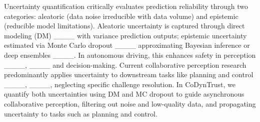 Uncertainty quantification critically evaluates prediction reliability through two categories: aleatoric (data noise irreducible with data volume) and epistemic (reducible model limitations). Aleatoric uncertainty is captured through direct modeling (DM) ____ with variance prediction outputs; epistemic uncertainty estimated via Monte Carlo dropout ____ approximating Bayesian inference or deep ensembles ____. In autonomous driving, this enhances safety in perception ____, ____ and decision-making. Current collaborative perception research predominantly applies uncertainty to downstream tasks like planning and control ____, ____, neglecting specific challenge resolution. In CoDynTrust, we quantify both uncertainties using DM and MC dropout to guide asynchronous collaborative perception, filtering out noise and low-quality data, and propagating uncertainty to tasks such as planning and control.

